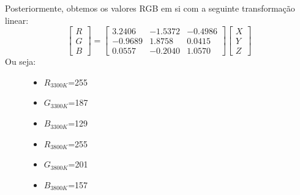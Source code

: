 \documentclass{article}
\begin{document}
Posteriormente, obtemos os valores RGB em si com a seguinte transformação linear\cite{cie}:
\begin{equation}
\begin{bmatrix}
R \\[4pt]
G \\[4pt]
B
\end{bmatrix}
=
\begin{bmatrix}
3.2406 & -1.5372 & -0.4986 \\
-0.9689 & 1.8758 & 0.0415 \\
0.0557 & -0.2040 & 1.0570
\end{bmatrix}
\begin{bmatrix}
X \\[4pt]
Y \\[4pt]
Z
\end{bmatrix}
\end{equation}
Ou seja:
\begin{figure}[h]
  \centering
  \begin{minipage}{0.45\textwidth}
    \centering
\begin{itemize}
  \item \(R_{3300K}\)=255
  \item \(G_{3300K}\)=187
  \item \(B_{3300K}\)=129
\end{itemize}
  \end{minipage}\hfill
  \begin{minipage}{0.45\textwidth}
    \centering
  \begin{itemize}
  \item \(R_{3800K}\)=255
  \item \(G_{3800K}\)=201
  \item \(B_{3800K}\)=157
\end{itemize}
  \end{minipage}
\end{figure}



\end{document}
